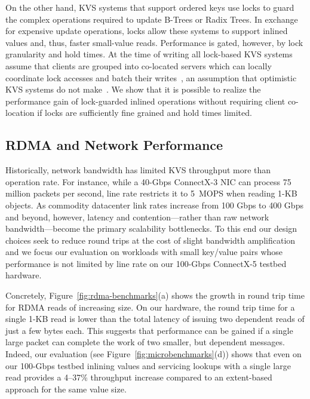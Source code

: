 On the other hand, KVS systems that support ordered keys use
locks to guard the complex operations required to update B-Trees or
Radix Trees.  In exchange for expensive update operations, locks allow
these systems to support inlined values and, thus, faster small-value
reads.  Performance is gated, however, by lock granularity and hold
times. At the time of writing all lock-based KVS systems assume that
clients are grouped into co-located servers which can locally
coordinate lock accesses and batch their writes~\cite{smart,sherman},
an assumption that optimistic
KVS systems do not make~\cite{ditto,fusee,clover,race}. We show that it is possible to
realize the performance gain of lock-guarded inlined operations
without requiring client co-location if locks are sufficiently fine
grained and hold times limited.

\subsection{RDMA and Network Performance}

Historically, network bandwidth has limited KVS throughput more than
operation rate. For instance, while a 40-Gbps ConnectX-3 NIC can
process 75 million packets per second, line rate restricts it to
5~MOPS when reading 1-KB objects. As commodity datacenter link rates
increase from 100 Gbps to 400 Gbps and beyond, however, latency and
contention---rather than raw network bandwidth---become the primary
scalability bottlenecks. To this end our design choices seek to reduce
round trips at the cost of slight bandwidth amplification
and we focus our evaluation on workloads with small key/value pairs
whose performance is not limited by line rate on our 100-Gbps ConnectX-5 testbed
hardware.

Concretely, Figure~\ref{fig:rdma-benchmarks}(a) shows the growth in
round trip time for RDMA reads of increasing size. On our hardware,
the round trip time for a single 1-KB read is lower than the total
latency of issuing two dependent reads of just a few bytes each.  This
suggests that performance can be gained if a single large packet can
complete the work of two smaller, but dependent messages.  
Indeed, our
evaluation (see Figure~\ref{fig:microbenchmarks}(d)) shows that even on our
100-Gbps testbed inlining values and servicing lookups with a single
large read provides a 4--37\% throughput increase compared to an
extent-based approach for the same value size.


